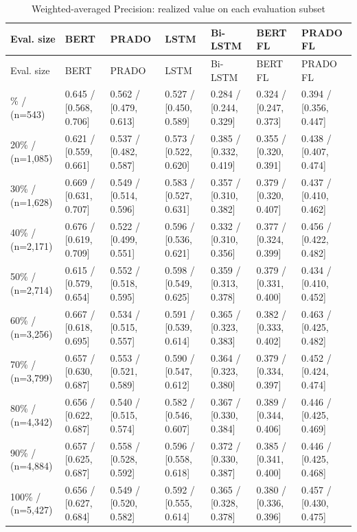 \setlength{\tabcolsep}{4pt}
\begin{longtable}{|p{1.9cm}|p{1.9cm}|p{1.9cm}|p{1.9cm}|p{1.9cm}|p{1.9cm}|p{1.9cm}|}
\caption{Weighted-averaged Precision: realized value on each evaluation subset}
\label{tab:ch3_t5} \\
\hline
Eval. size & BERT & PRADO & LSTM & Bi-LSTM & BERT FL & PRADO FL \\
\hline
\endfirsthead
\hline
Eval. size & BERT & PRADO & LSTM & Bi-LSTM & BERT FL & PRADO FL \\
\hline
\endhead
\hline
\endfoot
10\% / (n=543) & 0.645 / {[0.568, 0.706]} & 0.562 / {[0.479, 0.613]} & 0.527 / {[0.450, 0.589]} & 0.284 / {[0.244, 0.329]} & 0.324 / {[0.247, 0.373]} & 0.394 / {[0.356, 0.447]} \\
\hline
20\% / (n=1,085) & 0.621 / {[0.559, 0.661]} & 0.537 / {[0.482, 0.587]} & 0.573 / {[0.522, 0.620]} & 0.385 / {[0.332, 0.419]} & 0.355 / {[0.320, 0.391]} & 0.438 / {[0.407, 0.474]} \\
\hline
30\% / (n=1,628) & 0.669 / {[0.631, 0.707]} & 0.549 / {[0.514, 0.596]} & 0.583 / {[0.527, 0.631]} & 0.357 / {[0.310, 0.382]} & 0.379 / {[0.320, 0.407]} & 0.437 / {[0.410, 0.462]} \\
\hline
40\% / (n=2,171) & 0.676 / {[0.619, 0.709]} & 0.522 / {[0.499, 0.551]} & 0.596 / {[0.536, 0.621]} & 0.332 / {[0.310, 0.356]} & 0.377 / {[0.324, 0.399]} & 0.456 / {[0.422, 0.482]} \\
\hline
50\% / (n=2,714) & 0.615 / {[0.579, 0.654]} & 0.552 / {[0.518, 0.595]} & 0.598 / {[0.549, 0.625]} & 0.359 / {[0.313, 0.378]} & 0.379 / {[0.331, 0.400]} & 0.434 / {[0.410, 0.452]} \\
\hline
60\% / (n=3,256) & 0.667 / {[0.618, 0.695]} & 0.534 / {[0.515, 0.557]} & 0.591 / {[0.539, 0.614]} & 0.365 / {[0.323, 0.383]} & 0.382 / {[0.333, 0.402]} & 0.463 / {[0.425, 0.482]} \\
\hline
70\% / (n=3,799) & 0.657 / {[0.630, 0.687]} & 0.553 / {[0.521, 0.589]} & 0.590 / {[0.547, 0.612]} & 0.364 / {[0.323, 0.380]} & 0.379 / {[0.334, 0.397]} & 0.452 / {[0.424, 0.474]} \\
\hline
80\% / (n=4,342) & 0.656 / {[0.622, 0.687]} & 0.540 / {[0.515, 0.574]} & 0.582 / {[0.546, 0.607]} & 0.367 / {[0.330, 0.384]} & 0.389 / {[0.344, 0.406]} & 0.446 / {[0.425, 0.469]} \\
\hline
90\% / (n=4,884) & 0.657 / {[0.625, 0.687]} & 0.558 / {[0.528, 0.592]} & 0.596 / {[0.558, 0.618]} & 0.372 / {[0.330, 0.387]} & 0.385 / {[0.341, 0.400]} & 0.446 / {[0.425, 0.468]} \\
\hline
100\% / (n=5,427) & 0.656 / {[0.627, 0.684]} & 0.549 / {[0.520, 0.582]} & 0.592 / {[0.555, 0.614]} & 0.365 / {[0.328, 0.378]} & 0.380 / {[0.336, 0.396]} & 0.457 / {[0.430, 0.475]} \\
\hline
\end{longtable}

